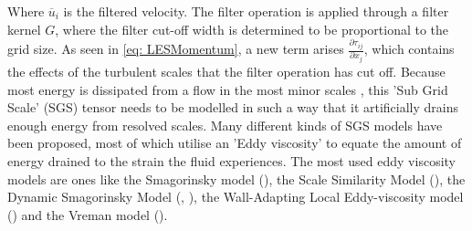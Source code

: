 Where $\overline{u}_i$ is the filtered velocity. The filter operation is applied through a filter kernel $G$, where the filter cut-off width is determined to be proportional to the grid size. As seen in \autoref{eq: LESMomentum}, a new term arises $\frac{\partial \tau_{ij}}{\partial x_j}$, which contains the effects of the turbulent scales that the filter operation has cut off. Because most energy is dissipated from a flow in the most minor scales \cite{Turbulence}, this 'Sub Grid Scale' (SGS) tensor needs to be modelled in such a way that it artificially drains enough energy from resolved scales. Many different kinds of SGS models have been proposed, most of which utilise an 'Eddy viscosity' to equate the amount of energy drained to the strain the fluid experiences. The most used eddy viscosity models are ones like the Smagorinsky model (\textcite{Smagorinsky1963}), the  Scale Similarity Model (\textcite{Bardina1980}), the Dynamic Smagorinsky Model (\textcite{Germano1991}, \textcite{Lilly1992}), the Wall-Adapting Local Eddy-viscosity model (\textcite{Nicoud1999}) and the Vreman model (\textcite{Vreman2003}).

